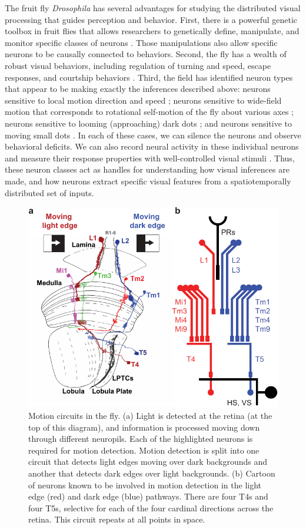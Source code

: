 The fruit fly \textit{Drosophila} has several advantages for studying the
distributed visual processing that guides perception and
behavior. First, there is a powerful genetic toolbox in fruit flies
that allows researchers to genetically define, manipulate, and monitor
specific classes of neurons \citep{luo:08}. Those manipulations
also allow specific neurons to be causally connected to
behaviors. Second, the fly has a wealth of robust visual behaviors,
including regulation of turning and speed, escape responses, and
courtship behaviors \citep{card:08,silies:14,spieth:74}.
Third, the field has identified neuron types that
appear to be making exactly the inferences described above: neurons
sensitive to local motion direction and speed \citep{Maisak:13};
neurons sensitive to wide-field motion that corresponds to rotational
self-motion of the fly about various axes \citep{joesch:08};
neurons sensitive to looming (approaching) dark
dots \citep{devries:12,klapoetke:17}; and neurons sensitive to
moving small dots \citep{keles:17}. In each of these cases, we
can silence the neurons and observe behavioral deficits. We can also
record neural activity in these individual neurons and measure their
response properties with well-controlled visual stimuli
\citep{salazar:16}. Thus, these neuron classes act as
handles for understanding how visual inferences are made, and how
neurons extract specific visual features from a spatiotemporally
distributed set of inputs.


\setlength{\columnsep}{20pt}
\begin{figure}
\centering
\includegraphics[width=.44\textwidth]{figs/flysetup}
\caption{\small Motion circuits in the fly. (a) Light is detected at the
retina (at the top of this diagram), and information is processed
moving down through different neuropils. Each of the highlighted
neurons is required for motion detection. Motion detection is split into one circuit that
detects light edges moving over dark backgrounds and another that
detects dark edges over light backgrounds. (b) Cartoon of
neurons known to be involved in motion detection in the light edge
(red) and dark edge (blue) pathways. 
There are four T4s and four T5s, selective for each
of the four cardinal directions across the retina. This circuit repeats at all
points in space.}
    \label{fig:setup}
    \vskip2pt
\end{figure}


